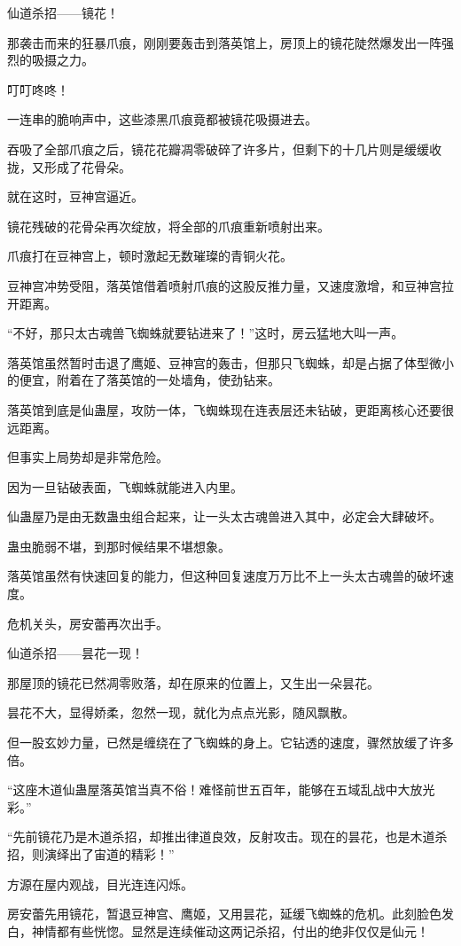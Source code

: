\begin{this_body}
仙道杀招——镜花！

那袭击而来的狂暴爪痕，刚刚要轰击到落英馆上，房顶上的镜花陡然爆发出一阵强烈的吸摄之力。

叮叮咚咚！

一连串的脆响声中，这些漆黑爪痕竟都被镜花吸摄进去。

吞吸了全部爪痕之后，镜花花瓣凋零破碎了许多片，但剩下的十几片则是缓缓收拢，又形成了花骨朵。

就在这时，豆神宫逼近。

镜花残破的花骨朵再次绽放，将全部的爪痕重新喷射出来。

爪痕打在豆神宫上，顿时激起无数璀璨的青铜火花。

豆神宫冲势受阻，落英馆借着喷射爪痕的这股反推力量，又速度激增，和豆神宫拉开距离。

“不好，那只太古魂兽飞蜘蛛就要钻进来了！”这时，房云猛地大叫一声。

落英馆虽然暂时击退了鹰姬、豆神宫的轰击，但那只飞蜘蛛，却是占据了体型微小的便宜，附着在了落英馆的一处墙角，使劲钻来。

落英馆到底是仙蛊屋，攻防一体，飞蜘蛛现在连表层还未钻破，更距离核心还要很远距离。

但事实上局势却是非常危险。

因为一旦钻破表面，飞蜘蛛就能进入内里。

仙蛊屋乃是由无数蛊虫组合起来，让一头太古魂兽进入其中，必定会大肆破坏。

蛊虫脆弱不堪，到那时候结果不堪想象。

落英馆虽然有快速回复的能力，但这种回复速度万万比不上一头太古魂兽的破坏速度。

危机关头，房安蕾再次出手。

仙道杀招——昙花一现！

那屋顶的镜花已然凋零败落，却在原来的位置上，又生出一朵昙花。

昙花不大，显得娇柔，忽然一现，就化为点点光影，随风飘散。

但一股玄妙力量，已然是缠绕在了飞蜘蛛的身上。它钻透的速度，骤然放缓了许多倍。

“这座木道仙蛊屋落英馆当真不俗！难怪前世五百年，能够在五域乱战中大放光彩。”

“先前镜花乃是木道杀招，却推出律道良效，反射攻击。现在的昙花，也是木道杀招，则演绎出了宙道的精彩！”

方源在屋内观战，目光连连闪烁。

房安蕾先用镜花，暂退豆神宫、鹰姬，又用昙花，延缓飞蜘蛛的危机。此刻脸色发白，神情都有些恍惚。显然是连续催动这两记杀招，付出的绝非仅仅是仙元！


\end{this_body}
